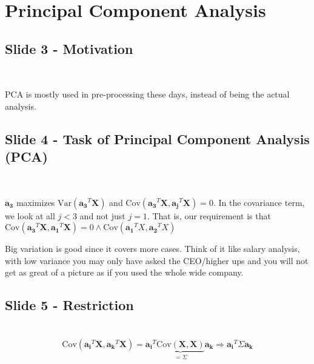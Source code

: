 \section{Principal Component Analysis}
\subsection{Slide 3 - Motivation}\hfill\\\par
\noindent PCA is mostly used in pre-processing these days, instead of being the actual analysis.
\par\bigskip
\subsection{Slide 4 - Task of Principal Component Analysis (PCA)}\hfill\\\par
\noindent $\mathbf{a_3}$ maximizes $\text{Var}\left(\mathbf{a_3}^T\mathbf{X}\right)$ and $\text{Cov}\left(\mathbf{a_3}^T\mathbf{X}, \mathbf{a_j}^T\mathbf{X}\right) = 0$. In the covariance term, we look at all $j<3$ and not just $j=1$. That is, our requirement is that $\text{Cov}\left(\mathbf{a_3}^T\mathbf{X},\mathbf{a_1}^T\mathbf{X}\right) = 0\wedge \text{Cov}\left(\mathbf{a_1}^TX,\mathbf{a_2}^TX\right)$
\par\bigskip
\noindent Big variation is good since it covers more cases. Think of it like salary analysis, with low variance you may only have asked the CEO/higher ups and you will not get as great of a picture as if you used the whole wide company.
\par\bigskip
\subsection{Slide 5 - Restriction}\hfill\\
\begin{equation*}
  \begin{gathered}
    \text{Cov}\left(\mathbf{a_i}^T\mathbf{X},\mathbf{a_k}^T\mathbf{X}\right) = \mathbf{a_i}^T\underbrace{\text{Cov}\left(\mathbf{X},\mathbf{X}\right)}_{\text{$=\Sigma$}}\mathbf{a_k}\Rightarrow\mathbf{a_i}^T\Sigma\mathbf{a_k}
  \end{gathered}
\end{equation*}
\par\bigskip
